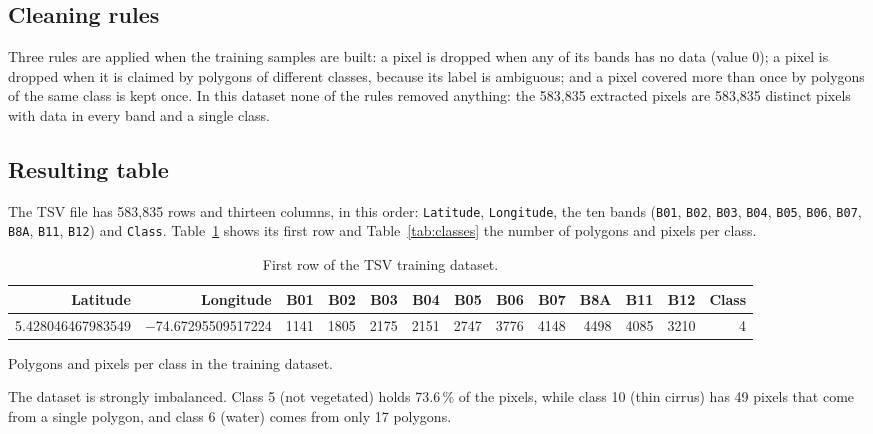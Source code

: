 \documentclass[11pt,a4paper]{article}
\begin{document}
\subsection{Cleaning rules}

Three rules are applied when the training samples are built: a pixel is
dropped when any of its bands has no data (value 0); a pixel is dropped when
it is claimed by polygons of different classes, because its label is
ambiguous; and a pixel covered more than once by polygons of the same class is
kept once. In this dataset none of the rules removed anything: the 583,835
extracted pixels are 583,835 distinct pixels with data in every band and a
single class.

\subsection{Resulting table}

The TSV file has 583,835 rows and thirteen columns, in this order:
\texttt{Latitude}, \texttt{Longitude}, the ten bands (\texttt{B01},
\texttt{B02}, \texttt{B03}, \texttt{B04}, \texttt{B05}, \texttt{B06},
\texttt{B07}, \texttt{B8A}, \texttt{B11}, \texttt{B12}) and \texttt{Class}.
Table~\ref{tab:sample} shows its first row and Table~\ref{tab:classes} the
number of polygons and pixels per class.

\begin{table}[H]
\centering\scriptsize
\setlength{\tabcolsep}{3.5pt}
\caption{First row of the TSV training dataset.}
\label{tab:sample}
\begin{tabular}{rrrrrrrrrrrrr}
\toprule
Latitude & Longitude & B01 & B02 & B03 & B04 & B05 & B06 & B07 & B8A & B11 & B12 & Class \\
\midrule
5.428046467983549 & $-$74.67295509517224 & 1141 & 1805 & 2175 & 2151 & 2747 & 3776 & 4148 & 4498 & 4085 & 3210 & 4 \\
\bottomrule
\end{tabular}
\end{table}

\begin{table}[H]
\centering\small
\caption{Polygons and pixels per class in the training dataset.}
\label{tab:classes}

\end{table}

The dataset is strongly imbalanced. Class 5 (not vegetated) holds 73.6\,\% of
the pixels, while class 10 (thin cirrus) has 49 pixels that come from a single
polygon, and class 6 (water) comes from only 17 polygons.
\end{document}
